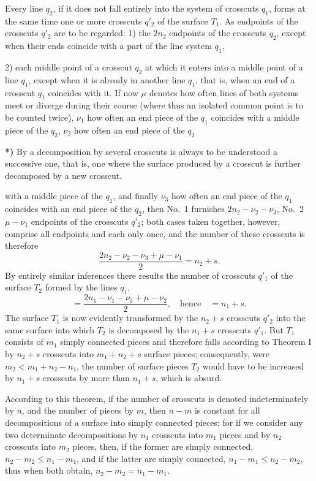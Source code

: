 \documentclass{article}
\begin{document}
Every line $q_2$, if it does not fall entirely into the system of crosscuts $q_1$, forms at the same time one or more crosscuts $q'_2$ of the surface $T_1$. As endpoints of the crosscuts $q'_2$ are to be regarded:
1) the $2n_2$ endpoints of the crosscuts $q_2$, except when their ends coincide with a part of the line system $q_1$,


2) each middle point of a crosscut $q_2$ at which it enters into a middle point of a line $q_1$, except when it is already in another line $q_1$, that is, when an end of a crosscut $q_1$ coincides with it.
If now $\mu$ denotes how often lines of both systems meet or diverge during their course (where thus an isolated common point is to be counted twice), $\nu_1$ how often an end piece of the $q_1$ coincides with a middle piece of the $q_2$, $\nu_2$ how often an end piece of the $q_2$

\textbf{*)} By a decomposition by several crosscuts is always to be understood a successive one, that is, one where the surface produced by a crosscut is further decomposed by a new crosscut.

with a middle piece of the $q_1$, and finally $\nu_3$ how often an end piece of the $q_1$ coincides with an end piece of the $q_2$, then No.\ 1 furnishes $2n_2 - \nu_2 - \nu_3$, No.\ 2 $\mu - \nu_1$ endpoints of the crosscuts $q'_2$; both cases taken together, however, comprise all endpoints and each only once, and the number of these crosscuts is therefore
\[
\frac{2n_2 - \nu_2 - \nu_3 + \mu - \nu_1}{2} = n_2 + s.
\]
By entirely similar inferences there results the number of crosscuts $q'_1$ of the surface $T_2$ formed by the lines $q_1$,
\[
= \frac{2n_1 - \nu_1 - \nu_3 + \mu - \nu_2}{2}, \quad \text{hence} \quad = n_1 + s.
\]
The surface $T_1$ is now evidently transformed by the $n_2 + s$ crosscuts $q'_2$ into the same surface into which $T_2$ is decomposed by the $n_1 + s$ crosscuts $q'_1$. But $T_1$ consists of $m_1$ simply connected pieces and therefore falls according to Theorem I by $n_2 + s$ crosscuts into $m_1 + n_2 + s$ surface pieces; consequently, were $m_2 < m_1 + n_2 - n_1$, the number of surface pieces $T_2$ would have to be increased by $n_1 + s$ crosscuts by more than $n_1 + s$, which is absurd.

According to this theorem, if the number of crosscuts is denoted indeterminately by $n$, and the number of pieces by $m$, then $n - m$ is constant for all decompositions of a surface into simply connected pieces; for if we consider any two determinate decompositions by $n_1$ crosscuts into $m_1$ pieces and by $n_2$ crosscuts into $m_2$ pieces, then, if the former are simply connected, $n_2 - m_2 \le n_1 - m_1$, and if the latter are simply connected, $n_1 - m_1 \le n_2 - m_2$, thus when both obtain, $n_2 - m_2 = n_1 - m_1$.
\end{document}
